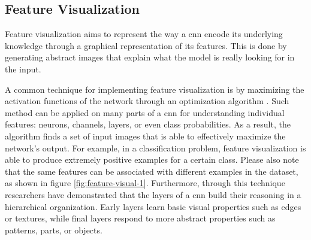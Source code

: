 \subsection{Feature Visualization}
\label{subsec:feature-vis}


Feature visualization aims to represent the way a \gls{cnn} encode its underlying knowledge through a graphical representation of its features. This is done by generating abstract images that explain what the model is really looking for in the input. 

A common technique for implementing feature visualization is by maximizing the activation functions of the network through an optimization algorithm \cite{erhan2009feature} \cite{nguyen2016multifaceted}. Such method can be applied on many parts of a \gls{cnn} for understanding individual features: neurons, channels, layers, or even class probabilities. As a result, the algorithm finds a set of input images that is able to effectively maximize the network's output. For example, in a classification problem, feature visualization is able to produce extremely positive examples for a certain class. Please also note that the same features can be associated with different examples in the dataset, as shown in figure \ref{fig:feature-visual-1}. Furthermore, through this technique researchers have demonstrated \cite{olah2017feature} that the layers of a \gls{cnn} build their reasoning in a hierarchical organization. Early layers learn basic visual properties such as edges or textures, while final layers respond to more abstract properties such as patterns, parts, or objects.


